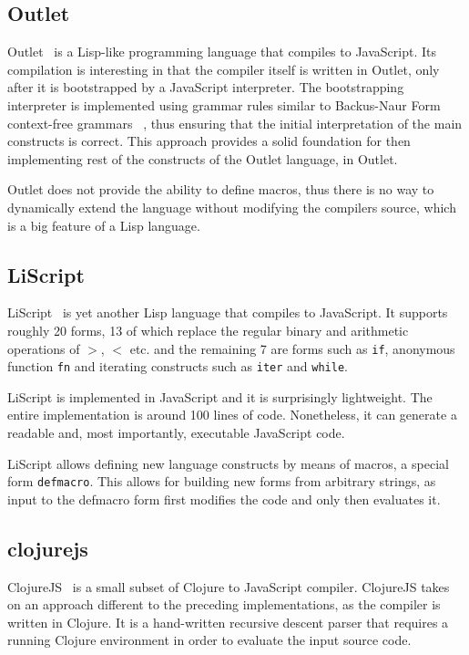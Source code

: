 \subsection{Outlet}
Outlet~\cite{Outlet:2013:Site} is a Lisp-like programming language that compiles to JavaScript. Its compilation is interesting in that the compiler itself is written in Outlet, only after it is bootstrapped by a JavaScript interpreter.
The bootstrapping interpreter is implemented using grammar rules similar to Backus-Naur Form context-free grammars ~\cite{RecursiveDescentParserJS:2013:Site}, thus ensuring that the initial interpretation of the main constructs is correct. This approach provides a solid foundation for then implementing rest of the constructs of the Outlet language, in Outlet.

Outlet does not provide the ability to define macros, thus there is no way to dynamically extend the language without modifying the compilers source, which is a big feature of a Lisp language.

\subsection{LiScript}
LiScript~\cite{LiScript:2013:Site} is yet another Lisp language that compiles to JavaScript. It supports roughly 20 forms, 13 of which replace the regular binary and arithmetic operations of \texttt{$>$}, \texttt{$<$} etc. and the remaining 7 are forms such as \texttt{if}, anonymous function \texttt{fn} and iterating constructs such as \texttt{iter} and \texttt{while}.

LiScript is implemented in JavaScript and it is surprisingly lightweight. The entire implementation is around 100 lines of code. Nonetheless, it can generate a readable and, most importantly, executable JavaScript code. 

LiScript allows defining new language constructs by means of macros, a special form \texttt{defmacro}. This allows for building new forms from arbitrary strings, as input to the defmacro form first modifies the code and only then evaluates it. 

\subsection{clojurejs}
ClojureJS~\cite{ClojureJS:2011:Site} is a small subset of Clojure to JavaScript compiler.
ClojureJS takes on an approach different to the preceding implementations, as the compiler is written in Clojure. 
It is a hand-written recursive descent parser that requires a running Clojure environment in order to evaluate the input source code.


